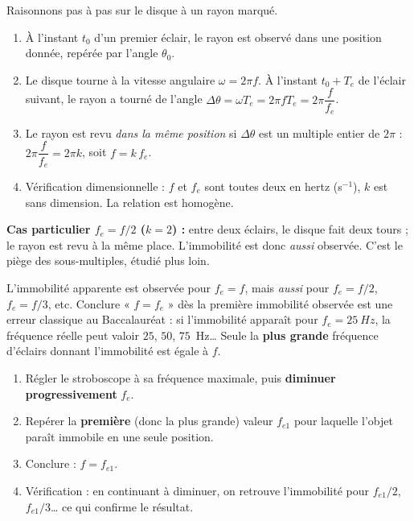 \documentclass[11pt]{article}
\begin{document}
\begin{experience}[Démonstration guidée : pourquoi $f = k\,f_e$ ?]
Raisonnons pas à pas sur le disque à un rayon marqué.
\begin{enumerate}
\item À l'instant $t_0$ d'un premier éclair, le rayon est observé dans une position donnée, repérée par l'angle $\theta_0$.
\item Le disque tourne à la vitesse angulaire $\omega = 2\pi f$. À l'instant $t_0 + T_e$ de l'éclair suivant, le rayon a tourné de l'angle $\Delta\theta = \omega T_e = 2\pi f T_e = 2\pi \dfrac{f}{f_e}$.
\item Le rayon est revu \emph{dans la même position} si $\Delta\theta$ est un multiple entier de $2\pi$ : $2\pi \dfrac{f}{f_e} = 2\pi k$, soit $\boxed{f = k\,f_e}$.
\item Vérification dimensionnelle : $f$ et $f_e$ sont toutes deux en hertz (s$^{-1}$), $k$ est sans dimension. La relation est homogène.
\end{enumerate}
\textbf{Cas particulier $f_e = f/2$ ($k=2$) :} entre deux éclairs, le disque fait deux tours ; le rayon est revu à la même place. L'immobilité est donc \emph{aussi} observée. C'est le piège des sous-multiples, étudié plus loin.
\end{experience}

\begin{attention}
L'immobilité apparente est observée pour $f_e = f$, mais \emph{aussi} pour $f_e = f/2$, $f_e = f/3$, etc. Conclure « $f = f_e$ » dès la première immobilité observée est une erreur classique au Baccalauréat : si l'immobilité apparaît pour $f_e = \SI{25}{Hz}$, la fréquence réelle peut valoir $25$, $50$, $75$~Hz\dots{} Seule la \textbf{plus grande} fréquence d'éclairs donnant l'immobilité est égale à $f$.
\end{attention}

\begin{methode}
\begin{enumerate}
\item Régler le stroboscope à sa fréquence maximale, puis \textbf{diminuer progressivement} $f_e$.
\item Repérer la \textbf{première} (donc la plus grande) valeur $f_{e1}$ pour laquelle l'objet paraît immobile en une seule position.
\item Conclure : $f = f_{e1}$.
\item Vérification : en continuant à diminuer, on retrouve l'immobilité pour $f_{e1}/2$, $f_{e1}/3$\dots{} ce qui confirme le résultat.
\end{enumerate}
\end{methode}
\end{document}
